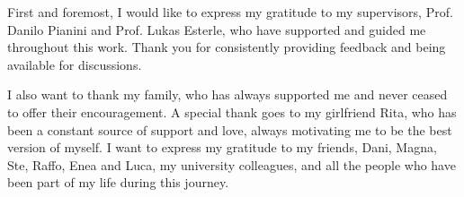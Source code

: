 \documentclass[12pt,a4paper,openright,twoside]{book}
\begin{document}

\backmatter





\begin{acknowledgements}
First and foremost, I would like to express my gratitude to my supervisors, Prof. Danilo Pianini and Prof. Lukas Esterle, who have supported and guided me throughout this work. 
Thank you for consistently providing feedback and being available for discussions.

I also want to thank my family, who has always supported me and never ceased to offer their encouragement.
A special thank goes to my girlfriend Rita, who has been a constant source of support and love, always motivating me to be the best version of myself.
I want to express my gratitude to my friends, Dani, Magna, Ste, Raffo, Enea and Luca, my university colleagues, and all the people who have been part of my life during this journey.
\end{acknowledgements}
\end{document}
